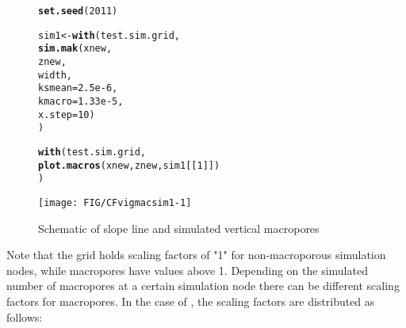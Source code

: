 \documentclass[article,nojss]{jss}\usepackage[]{graphicx}\usepackage[]{xcolor}
\makeatletter
\def\maxwidth{ %
  \ifdim\Gin@nat@width>\linewidth
    \linewidth
  \else
    \Gin@nat@width
  \fi
}
\newcommand{\hlnum}[1]{\textcolor[rgb]{0.686,0.059,0.569}{#1}}%
\newcommand{\hldef}[1]{\textcolor[rgb]{0.345,0.345,0.345}{#1}}%
\newcommand{\hlkwb}[1]{\textcolor[rgb]{0.69,0.353,0.396}{#1}}%
\newcommand{\hlkwc}[1]{\textcolor[rgb]{0.333,0.667,0.333}{#1}}%
\newcommand{\hlkwd}[1]{\textcolor[rgb]{0.737,0.353,0.396}{\textbf{#1}}}%
\newenvironment{kframe}{%
 \def\at@end@of@kframe{}%
 \ifinner\ifhmode%
  \def\at@end@of@kframe{\end{minipage}}%
  \begin{minipage}{\columnwidth}%
 \fi\fi%
 \def\FrameCommand##1{\hskip\@totalleftmargin \hskip-\fboxsep
 \colorbox{shadecolor}{##1}\hskip-\fboxsep
     \hskip-\linewidth \hskip-\@totalleftmargin \hskip\columnwidth}%
 \MakeFramed {\advance\hsize-\width
   \@totalleftmargin\z@ \linewidth\hsize
   \@setminipage}}%
 {\par\unskip\endMakeFramed%
 \at@end@of@kframe}
\newenvironment{knitrout}{}{} %
\makeatother
\begin{document}
\begin{figure}[h]
\begin{center}
\begin{knitrout}
\color{fgcolor}\begin{kframe}
\begin{alltt}
 \hlkwd{set.seed}\hldef{(}\hlnum{2011}\hldef{)}

 \hldef{sim1} \hlkwb{<-} \hlkwd{with}\hldef{(test.sim.grid,}
              \hlkwd{sim.mak}\hldef{(xnew,}
                      \hldef{znew,}
                      \hldef{width,}
                      \hlkwc{ksmean}\hldef{=}\hlnum{2.5e-6}\hldef{,}
                      \hlkwc{kmacro}\hldef{=}\hlnum{1.33e-5}\hldef{,}
                      \hlkwc{x.step}\hldef{=}\hlnum{10}\hldef{)}
              \hldef{)}

 \hlkwd{with}\hldef{(test.sim.grid,}
      \hlkwd{plot.macros}\hldef{(xnew, znew, sim1[[}\hlnum{1}\hldef{]])}
    \hldef{)}
\end{alltt}
\end{kframe}
\texttt{[image: FIG/CFvigmacsim1-1]} 
\end{knitrout}
\caption{\label{fig:macsim1} Schematic of slope line and simulated vertical macropores}
\end{center}
\end{figure}

\clearpage
Note that the grid  holds scaling factors of "1" for non-macroporous simulation 
nodes, while 
macropores have values above 1. Depending on the simulated number of macropores at a certain
simulation node there can be different scaling factors for macropores. In the case of 
, the scaling factors are distributed as follows:
\end{document}
